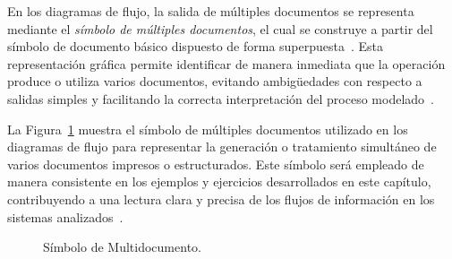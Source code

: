 \documentclass[12pt,twoside]{book}
\begin{document}
						En los diagramas de flujo, la salida de múltiples documentos se representa mediante el \textit{símbolo de múltiples documentos}, el cual se construye a partir del símbolo de documento básico dispuesto de forma superpuesta~\cite{SmartDrawFlowchartSymbols}. Esta representación gráfica permite identificar de manera inmediata que la operación produce o utiliza varios documentos, evitando ambigüedades con respecto a salidas simples y facilitando la correcta interpretación del proceso modelado~\cite{Joyanes2007Fundamentos,Manzano2017Programacion}.
						
						La Figura~\ref{fig:DFMultiDocumento} muestra el símbolo de múltiples documentos utilizado en los diagramas de flujo para representar la generación o tratamiento simultáneo de varios documentos impresos o estructurados. Este símbolo será empleado de manera consistente en los ejemplos y ejercicios desarrollados en este capítulo, contribuyendo a una lectura clara y precisa de los flujos de información en los sistemas analizados~\cite{Kendall2014Systems,Pressman2019Software}.
						\begin{figure}[h]
							\centering
							\caption{Símbolo de Multidocumento.}
							\label{fig:DFMultiDocumento}
						\end{figure}
						
\end{document}
